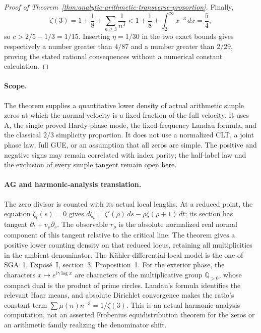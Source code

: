 \begin{proof}[Proof of Theorem~\ref{thm:analytic-arithmetic-transverse-proportion}]
Finally,
\[
 \zeta(3)=1+\frac18+\sum_{n\ge3}\frac1{n^3}
       <1+\frac18+\int_2^\infty x^{-3}\,dx=\frac54,
\]
so $c>2/5-1/3=1/15$. Inserting $\eta=1/30$ in the two
exact bounds gives respectively a number greater than
$4/87$ and a number greater than $2/29$, proving the stated
rational consequences without a numerical constant
calculation.
\end{proof}

\paragraph{Scope.}
The theorem supplies a quantitative lower density of actual
arithmetic simple zeros at which the normal velocity is a
fixed fraction of the full velocity. It uses A, the single
proved Hardy-phase mode, the fixed-frequency Landau formula,
and the classical $2/3$ simplicity proportion. It does not
use a normalized CLT, a joint phase law, full GUE, or an
assumption that all zeros are simple. The positive and
negative signs may remain correlated with index parity;
the half-label law and the exclusion of every simple tangent
remain open here.

\paragraph{AG and harmonic-analysis translation.}
The zero divisor is counted with its actual local lengths.
At a reduced point, the equation $\zeta_t(s)=0$ gives
$d\zeta_t=\zeta'(\rho)\,ds-\rho\zeta(\rho+1)\,dt$;
its section has tangent $\partial_t+v_\rho\partial_s$.
The observable $r_\rho$ is the absolute normalized real
normal component of this tangent relative to the critical
line. The theorem gives a positive lower counting density
on that reduced locus, retaining all multiplicities in the
ambient denominator. The K\"ahler-differential local model
is the one of SGA~1, Expos\'e~I, section~3, Proposition~1.
For the exterior phase, the characters $x\mapsto
e^{i\gamma\log x}$ are characters of the multiplicative
group $\mathbb Q_{>0}$, whose compact dual is the product
of prime circles. Landau's formula identifies the relevant
Haar means, and absolute Dirichlet convergence makes the
ratio's constant term $\sum\mu(n)n^{-3}=1/\zeta(3)$.
This is an actual harmonic-analysis computation, not an
asserted Frobenius equidistribution theorem for the zeros
or an arithmetic family realizing the denominator shift.
